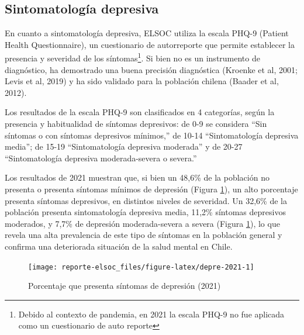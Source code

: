 \documentclass[
  12pt,
]{book}
\begin{document}
\hypertarget{sintomatologuxeda-depresiva}{%
\subsection*{Sintomatología depresiva}\label{sintomatologuxeda-depresiva}}

En cuanto a sintomatología depresiva, ELSOC utiliza la escala PHQ-9 (Patient Health Questionnaire), un cuestionario de autorreporte que permite establecer la presencia y severidad de los síntomas\footnote{Debido al contexto de pandemia, en 2021 la escala PHQ-9 no fue aplicada como un cuestionario de auto reporte}. Si bien no es un instrumento de diagnóstico, ha demostrado una buena precisión diagnóstica (Kroenke et al, 2001; Levis et al, 2019) y ha sido validado para la población chilena (Baader et al, 2012).

Los resultados de la escala PHQ-9 son clasificados en 4 categorías, según la presencia y habitualidad de síntomas depresivos: de 0-9 se considera ``Sin síntomas o con síntomas depresivos mínimos,'' de 10-14 ``Sintomatología depresiva media''; de 15-19 ``Sintomatología depresiva moderada'' y de 20-27 ``Sintomatología depresiva moderada-severa o severa.''

Los resultados de 2021 muestran que, si bien un 48,6\% de la población no presenta o presenta síntomas mínimos de depresión (Figura \ref{fig:depre-2021}), un alto porcentaje presenta síntomas depresivos, en distintos niveles de severidad. Un 32,6\% de la población presenta sintomatología depresiva media, 11,2\% síntomas depresivos moderados, y 7,7\% de depresión moderada-severa a severa (Figura \ref{fig:depre-2021}), lo que revela una alta prevalencia de este tipo de síntomas en la población general y confirma una deteriorada situación de la salud mental en Chile.

\begin{figure}

{\centering \texttt{[image: reporte-elsoc\_files/figure-latex/depre-2021-1]} 

}

\caption{Porcentaje que presenta síntomas de depresión (2021)}\label{fig:depre-2021}
\end{figure}
\end{document}
